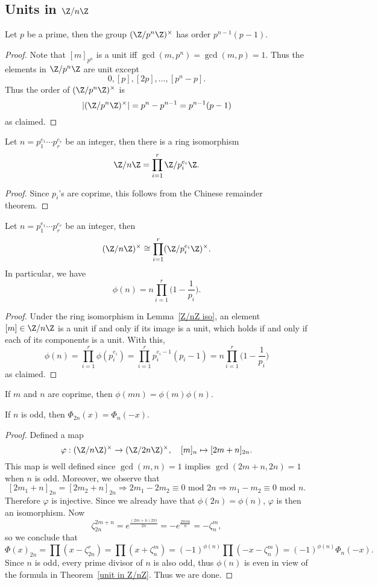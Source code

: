 \subsection{Units in \boldmath$\Z/n\Z$}
\begin{proposition}
Let $p$ be a prime, then the group $(\Z/p^n\Z)^\times$ has order $p^{n-1}(p-1)$.
\end{proposition}
\begin{proof}
Note that $[m]_{p^n}$ is a unit iff $\gcd(m,p^n)=\gcd(m,p)=1$. Thus the elements in $\Z/p^n\Z$ are unit except
\[0,[p],[2p],\dots,[p^{n}-p].\]
Thus the order of $(\Z/p^n\Z)^\times$ is
\[|(\Z/p^n\Z)^\times|=p^n-p^{n-1}=p^{n-1}(p-1)\]
as claimed.
\end{proof}
\begin{lemma}\label{Z/nZ iso}
Let $n=p_1^{e_1}\cdots p_r^{e_r}$ be an integer, then there is a ring isomorphism
\[\Z/n\Z=\prod_{i=1}^{r}\Z/p_i^{e_i}\Z.\]
\end{lemma}
\begin{proof}
Since $p_i$'s are coprime, this follows from the Chinese remainder theorem.
\end{proof}
\begin{theorem}\label{unit in Z/nZ}
Let $n=p_1^{e_1}\cdots p_r^{e_r}$ be an integer, then
\[(\Z/n\Z)^\times\cong\prod_{i=1}^{r}(\Z/p_i^{e_i}\Z)^{\times}.\]
In particular, we have
\[\phi(n)=n\prod_{i=1}^{r}\Big(1-\frac{1}{p_i}\Big).\]
\end{theorem}
\begin{proof}
Under the ring isomorphism in Lemma~\ref{Z/nZ iso}, an element $[m]\in\Z/n\Z$ is a unit if and only if its image is a unit, which holds if and only if each of its components is a unit. With this,
\[\phi(n)=\prod_{i=1}^{r}\phi(p_i^{e_i})=\prod_{i=1}^{r}p_i^{e_i-1}(p_i-1)=n\prod_{i=1}^{r}\Big(1-\frac{1}{p_i}\Big)\]
as claimed.
\end{proof}
\begin{corollary}
If $m$ and $n$ are coprime, then $\phi(mn)=\phi(m)\phi(n)$.
\end{corollary}
\begin{corollary}
If $n$ is odd, then $\Phi_{2n}(x)=\Phi_{n}(-x)$.
\end{corollary}
\begin{proof}
Defined a map
\[\varphi:(\Z/n\Z)^{\times}\to (\Z/2n\Z)^{\times},\quad [m]_n\mapsto[2m+n]_{2n}.\]
This map is well defined since $\gcd(m,n)=1$ implies $\gcd(2m+n,2n)=1$ when $n$ is odd. Moreover, we observe that
\[[2m_1+n]_{2n}=[2m_2+n]_{2n}\Longrightarrow 2m_1-2m_2\equiv 0\text{ mod $2n$}\Longrightarrow m_1-m_2\equiv 0\text{ mod $n$}.\]
Therefore $\varphi$ is injective. Since we already have that $\phi(2n)=\phi(n)$, $\varphi$ is then an isomorphism. Now 
\[\zeta^{2m+n}_{2n}=e^{\frac{(2m+n)2\pi i}{2n}}=-e^{\frac{2\pi im}{n}}=-\zeta^m_n,\] 
so we conclude that
\[\Phi(x)_{2n}=\prod(x-\zeta_{2n}^r)=\prod(x+\zeta_n^m)=(-1)^{\phi(n)}\prod(-x-\zeta_n^m)=(-1)^{\phi(n)}\Phi_n(-x).\]
Since $n$ is odd, every prime divisor of $n$ is also odd, thus $\phi(n)$ is even in view of the formula in Theorem~\ref{unit in Z/nZ}. Thus we are done.
\end{proof}

